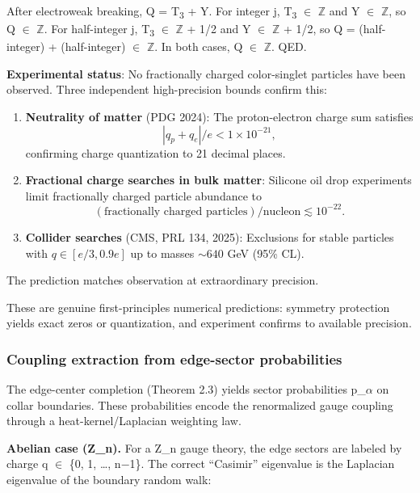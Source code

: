 \documentclass[11pt,a4paper]{article}
\theoremstyle{remark}
\begin{document}
After electroweak breaking, Q = T\textsubscript{3} + Y. For integer j, T\textsubscript{3} \ensuremath{\in} \ensuremath{\mathbb{Z}} and Y \ensuremath{\in} \ensuremath{\mathbb{Z}},
so Q \ensuremath{\in} \ensuremath{\mathbb{Z}}. For half-integer j, T\textsubscript{3} \ensuremath{\in} \ensuremath{\mathbb{Z}} + 1/2 and Y \ensuremath{\in} \ensuremath{\mathbb{Z}} + 1/2, so
Q = (half-integer) + (half-integer) \ensuremath{\in} \ensuremath{\mathbb{Z}}. In both cases, Q \ensuremath{\in} \ensuremath{\mathbb{Z}}. QED.

\textbf{Experimental status}: No fractionally charged color-singlet particles
have been observed. Three independent high-precision bounds confirm this:

\begin{enumerate}
\def\labelenumi{\arabic{enumi}.}
\item
  \textbf{Neutrality of matter} (PDG 2024): The proton-electron charge sum satisfies
  \[|q_p + q_e|/e < 1 \times 10^{-21},\]
  confirming charge quantization to 21 decimal places.
\item
  \textbf{Fractional charge searches in bulk matter}: Silicone oil drop experiments
  limit fractionally charged particle abundance to
  \[(\text{fractionally charged particles})/\text{nucleon} \lesssim 10^{-22}.\]
\item
  \textbf{Collider searches} (CMS, PRL 134, 2025): Exclusions for stable particles
  with \(q \in [e/3, 0.9e]\) up to masses \(\sim 640\) GeV (95\% CL).
\end{enumerate}

The prediction matches observation at extraordinary precision.

These are genuine first-principles numerical predictions: symmetry protection
yields exact zeros or quantization, and experiment confirms to available precision.

\subsubsection{Coupling extraction from edge-sector probabilities}\label{coupling-extraction-from-edge-sector-probabilities}

The edge-center completion (Theorem 2.3) yields sector probabilities p\_\ensuremath{\alpha}
on collar boundaries. These probabilities encode the renormalized gauge
coupling through a heat-kernel/Laplacian weighting law.

\textbf{Abelian case (Z\_n).} For a Z\_n gauge theory, the edge
sectors are labeled by charge q \ensuremath{\in} \{0, 1, \ldots, n\ensuremath{-}1\}. The correct
``Casimir'' eigenvalue is the Laplacian eigenvalue of the boundary random walk:
\end{document}
